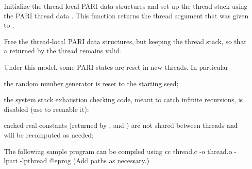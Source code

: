 Initialize the thread-local PARI data structures and set up the thread stack
using the PARI thread data . This function returns the thread
argument  that was given to .

Free the thread-local PARI data structures, but keeping the thread stack, so
that a  returned by the thread remains valid.

\noindent Under this model, some PARI states are reset in new threads. In
particular

\item the random number generator is reset to the starting seed;

\item the system stack exhaustion checking code, meant to catch infinite
recursions, is disabled (use  to reenable it);

\item cached real constants (returned by ,  and
) are not shared between threads and will be recomputed as
needed;

\noindent The following sample program can be compiled using
\bprog
    cc thread.c -o thread.o -lpari -lpthread
@eprog\noindent
(Add  paths as necessary.)

\noindent{}

\vfill\eject
